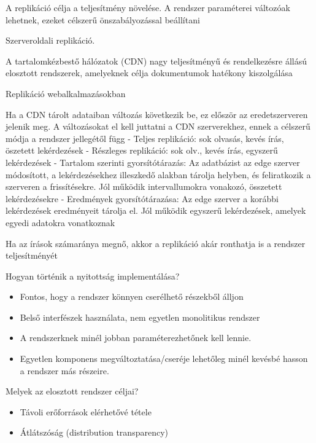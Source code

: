 \documentclass[12pt]{article}
\begin{document}
\begin{description}[style=unboxed]
    \item A replikáció célja a teljesítmény növelése. A rendszer paraméterei változóak lehetnek, ezeket célszerű önszabályozással beállítani
    \item  Szerveroldali replikáció.
    \item A tartalomkézbestő hálózatok (CDN) nagy teljesítményű és rendelkezésre állású elosztott rendszerek, amelyeknek célja
        dokumentumok hatékony kiszolgálása
    \item  Replikáció webalkalmazásokban
    \item Ha a CDN tárolt adataiban változás következik be, ez először az eredetszerveren jelenik meg. A változásokat el kell juttatni
        a CDN szerverekhez, ennek a célszerű módja a rendszer jellegétől függ
        - Teljes replikáció: sok olvasás, kevés írás, öszetett lekérdezések
        - Részleges replikáció: sok olv., kevés írás, egyszerű lekérdezések
        - Tartalom szerinti gyorsítótárazás: Az adatbázist az edge szerver módosított, a lekérdezésekhez illeszkedő alakban
        tárolja helyben, és feliratkozik a szerveren a frissítésekre. Jól működik intervallumokra vonakozó, összetett lekérdezésekre
        - Eredmények gyorsítótárazása: Az edge szerver a korábbi lekérdezések eredményeit tárolja el. Jól működik egyszerű
        lekérdezések, amelyek egyedi adatokra vonatkoznak
    \item Ha az írások számaránya megnő, akkor a replikáció akár ronthatja is a rendszer teljesítményét 
        \color{clrNonExam}
    \item Hogyan történik a nyitottság implementálása?
        \begin{itemize}
            \item Fontos, hogy a rendszer könnyen cserélhető részekből álljon
            \item Belső interfészek használata, nem egyetlen monolitikus rendszer
            \item A rendszerknek minél jobban paraméterezhetőnek kell lennie.
            \item Egyetlen komponens megváltoztatása/cseréje lehetőleg minél
                kevésbé hasson a rendszer más részeire.
        \end{itemize}
    \item Melyek az elosztott rendszer céljai?
        \begin{itemize}
            \item Távoli erőforrások elérhetővé tétele
            \item Átlátszóság (distribution transparency)

\end{itemize}
\end{description}
\end{document}
